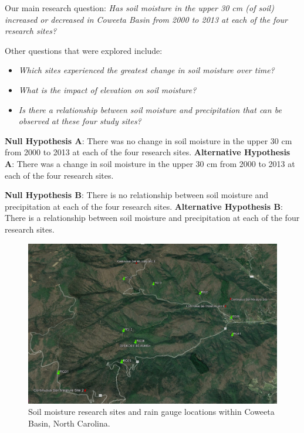 \documentclass[
  12pt,
]{article}
\providecommand{\tightlist}{%
  \setlength{\itemsep}{0pt}\setlength{\parskip}{0pt}}
\begin{document}
Our main research question: \emph{Has soil moisture in the upper 30 cm
(of soil) increased or decreased in Coweeta Basin from 2000 to 2013 at
each of the four research sites?}

Other questions that were explored include:

\begin{itemize}
\tightlist
\item
  \emph{Which sites experienced the greatest change in soil moisture
  over time?}
\item
  \emph{What is the impact of elevation on soil moisture?}
\item
  \emph{Is there a relationship between soil moisture and precipitation
  that can be observed at these four study sites?}
\end{itemize}

\textbf{Null Hypothesis A}: There was no change in soil moisture in the
upper 30 cm from 2000 to 2013 at each of the four research sites.
\textbf{Alternative Hypothesis A}: There was a change in soil moisture
in the upper 30 cm from 2000 to 2013 at each of the four research sites.

\textbf{Null Hypothesis B}: There is no relationship between soil
moisture and precipitation at each of the four research sites.
\textbf{Alternative Hypothesis B}: There is a relationship between soil
moisture and precipitation at each of the four research sites.

\begin{figure}
\centering
\includegraphics{../Data/precipandsmois.png}
\caption{Soil moisture research sites and rain gauge locations within
Coweeta Basin, North Carolina.}
\end{figure}
\end{document}

